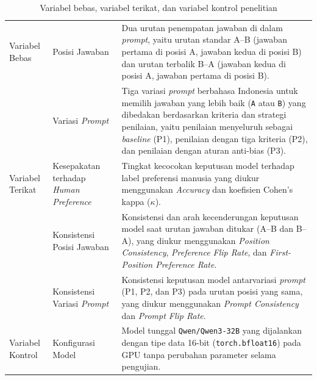 \begin{table}[H]
  \centering
  {\footnotesize\linespread{1.0}\selectfont
  \let\normalsize\footnotesize
  \setlength{\abovecaptionskip}{0pt}
  \setlength{\belowcaptionskip}{\baselineskip}
  \caption{Variabel bebas, variabel terikat, dan variabel kontrol penelitian}
  \label{tab:variabel_penelitian}
  }
  {\small
  \linespread{1.00}\selectfont
  \renewcommand{\arraystretch}{1.06}
  \setlength{\tabcolsep}{5pt}
  \begin{tabular}{|>{\raggedright\arraybackslash}p{2.15cm}|>{\raggedright\arraybackslash}p{3.15cm}|>{\raggedright\arraybackslash}p{7.55cm}|}
    \hline
    \multicolumn{1}{|>{\centering\arraybackslash}p{2.15cm}|}{\textbf{Jenis Variabel}} &
    \multicolumn{1}{>{\centering\arraybackslash}p{3.15cm}|}{\textbf{Nama Variabel}} &
    \multicolumn{1}{>{\centering\arraybackslash}p{7.55cm}|}{\textbf{Definisi Operasional}} \\
    \hline
    Variabel Bebas & Posisi Jawaban & Dua urutan penempatan jawaban di dalam \textit{prompt}, yaitu urutan standar A--B (jawaban pertama di posisi A, jawaban kedua di posisi B) dan urutan terbalik B--A (jawaban kedua di posisi A, jawaban pertama di posisi B). \\
    \cline{2-3}
     & Variasi \textit{Prompt} & Tiga variasi \textit{prompt} berbahasa Indonesia untuk memilih jawaban yang lebih baik (\texttt{A} atau \texttt{B}) yang dibedakan berdasarkan kriteria dan strategi penilaian, yaitu penilaian menyeluruh sebagai \textit{baseline} (P1), penilaian dengan tiga kriteria (P2), dan penilaian dengan aturan anti-bias (P3). \\
    \hline
    Variabel Terikat & Kesepakatan terhadap \textit{Human Preference} & Tingkat kecocokan keputusan model terhadap label preferensi manusia yang diukur menggunakan \textit{Accuracy} dan koefisien Cohen's kappa ($\kappa$). \\
    \cline{2-3}
     & Konsistensi Posisi Jawaban & Konsistensi dan arah kecenderungan keputusan model saat urutan jawaban ditukar (A--B dan B--A), yang diukur menggunakan \textit{Position Consistency}, \textit{Preference Flip Rate}, dan \textit{First-Position Preference Rate}. \\
    \cline{2-3}
     & Konsistensi Variasi \textit{Prompt} & Konsistensi keputusan model antarvariasi \textit{prompt} (P1, P2, dan P3) pada urutan posisi yang sama, yang diukur menggunakan \textit{Prompt Consistency} dan \textit{Prompt Flip Rate}. \\
    \hline
    Variabel Kontrol & Konfigurasi Model & Model tunggal \texttt{Qwen/\allowbreak Qwen3-\allowbreak 32B} \cite{yangQwen3TechnicalReport2025} yang dijalankan dengan tipe data 16-bit (\texttt{torch.bfloat16}) pada GPU tanpa perubahan parameter selama pengujian. \\

\end{tabular}}
\end{table}
